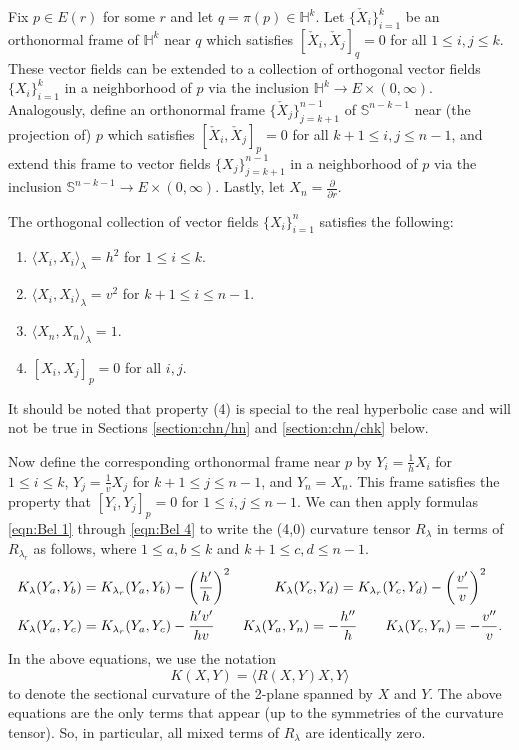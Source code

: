 \documentclass[10pt]{amsart}
\def\l{\lambda}
\def\S{\mathcal{S}}
\def\la{\langle}
\def\ra{\rangle}
\def\ddr{\frac{\partial}{\partial r}}
\def\H{\mathbb{H}}
\def\S{\mathbb{S}}
\theoremstyle{definition}
\theoremstyle{remark}
\numberwithin{equation}{section}
\begin{document}
Fix $p \in E(r)$ for some $r$ and let $q = \pi(p) \in \H^k$.  
Let $\{ \check{X}_i \}_{i=1}^k$ be an orthonormal frame of $\H^k$ near $q$ which satisfies $[\check{X}_i,\check{X}_j]_q = 0$ for all $1 \leq i, j \leq k$.
These vector fields can be extended to a collection of orthogonal vector fields $\{ X_i \}_{i=1}^k$ in a neighborhood of $p$ via the inclusion $\H^k \to E \times (0,\infty)$.  
Analogously, define an orthonormal frame $\{ \check{X}_j \}_{j=k+1}^{n-1}$ of $\S^{n-k-1}$ near (the projection of) $p$ which satisfies $[\check{X}_i,\check{X}_j]_p = 0$ for all $k+1 \leq i, j \leq n-1$, and extend this frame to vector fields $\{ X_j \}_{j=k+1}^{n-1}$ in a neighborhood of $p$ via the inclusion $\S^{n-k-1} \to E \times (0,\infty)$.  
Lastly, let $X_n = \ddr$.  

The orthogonal collection of vector fields $\{ X_i \}_{i=1}^n$ satisfies the following:
	\begin{enumerate}
	\item  $\la X_i,X_i \ra_\l = h^2$ for $1 \leq i \leq k$.
	\item  $\la X_i, X_i \ra_\l = v^2$ for $k+1 \leq i \leq n-1$.  
	\item  $\la X_n, X_n \ra_\l = 1$.
	\item  $[X_i,X_j]_p = 0$ for all $i, j$.
	\end{enumerate}
It should be noted that property (4) is special to the real hyperbolic case and will not be true in Sections \ref{section:chn/hn} and \ref{section:chn/chk} below.

Now define the corresponding orthonormal frame near $p$ by $Y_i = \frac{1}{h} X_i$ for $1 \leq i \leq k$, $Y_j = \frac{1}{v} X_j$ for $k+1 \leq j \leq n-1$, and $Y_n = X_n$.  
This frame satisfies the property that $[Y_i,Y_j]_p = 0$ for $1 \leq i, j \leq n-1$.
We can then apply formulas \eqref{eqn:Bel 1} through \eqref{eqn:Bel 4} to write the (4,0) curvature tensor $R_\l$ in terms of $R_{\l_r}$ as follows, where $1 \leq a, b \leq k$ and $k+1 \leq c, d \leq n-1$.  
	\begin{align*}
	&K_\l (Y_a,Y_b) = K_{\l_r}(Y_a,Y_b) - \left( \frac{h'}{h} \right)^2    \hskip 30pt  K_\l (Y_c,Y_d) = K_{\l_r}(Y_c,Y_d) - \left( \frac{v'}{v} \right)^2   \\
	&K_\l (Y_a,Y_c) = K_{\l_r}(Y_a,Y_c) - \frac{h'v'}{hv}    \hskip 20pt  K_\l (Y_a,Y_n) = - \frac{h''}{h}  \hskip 20pt   K_\l(Y_c,Y_n) = - \frac{v''}{v}.
	\end{align*}
In the above equations, we use the notation 
	$$ K(X, Y) = \la R(X, Y)X, Y \ra $$
to denote the sectional curvature of the 2-plane spanned by $X$ and $Y$.
The above equations are the only terms that appear (up to the symmetries of the curvature tensor).  
So, in particular, all mixed terms of $R_\l$ are identically zero.
\end{document}
